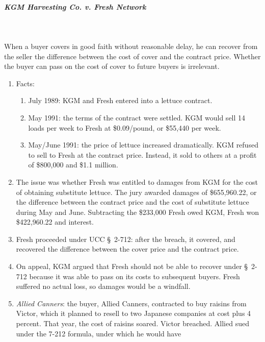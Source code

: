 \paragraph{\emph{KGM Harvesting Co. v. Fresh Network}}
~\\\\
When a buyer covers in good faith without reasonable delay, he can recover 
from the seller the difference between the cost of cover and the contract 
price. Whether the buyer can pass on the cost of cover to future buyers is 
irrelevant.
\begin{enumerate}
    \item Facts:
    \begin{enumerate}
        \item July 1989: KGM and Fresh entered into a lettuce contract.
        \item May 1991: the terms of the contract were settled. KGM would sell 
        14 loads per week to Fresh at \$0.09/pound, or \$55,440 per week.
        \item May/June 1991: the price of lettuce increased dramatically. KGM 
        refused to sell to Fresh at the contract price. Instead, it sold to 
        others at a profit of \$800,000 and \$1.1 million.
    \end{enumerate}
    \item The issue was whether Fresh was entitled to damages from KGM for 
    the cost of obtaining substitute lettuce. The jury awarded damages of 
    \$655,960.22, or the difference between the contract price and the cost of 
    substitute lettuce during May and June. Subtracting the \$233,000 Fresh 
    owed KGM, Fresh won \$422,960.22 and interest.
    \item Fresh proceeded under UCC \S\ 2-712: after the breach, it covered, 
    and recovered the difference between the cover price and the contract 
    price.
    \item On appeal, KGM argued that Fresh should not be able to recover under 
    \S\ 2-712 because it was able to pass on its costs to subsequent buyers. 
    Fresh suffered no actual loss, so damages would be a windfall.
    \item \emph{Allied Canners}: the buyer, Allied Canners, contracted to buy 
    raisins from Victor, which it planned to resell to two Japanese companies 
    at cost plus 4 percent. That year, the cost of raisins soared. Victor 
    breached. Allied sued under the 7-212 formula, under which he would have 

\end{enumerate}
